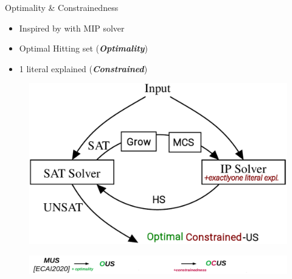 \documentclass{beamer}
\begin{document}
\begin{frame}{Optimality \& Constrainedness}
	\begin{minipage}{0.49\textwidth}
		\begin{itemize}
			\item Inspired by \cite{ignatiev2015smallest} with MIP solver
			\item Optimal Hitting set (\emph{\textbf{Optimality}})
			\item 1 literal explained (\emph{\textbf{Constrained}})
		\end{itemize}
	\end{minipage}
	\begin{minipage}{0.5\textwidth}
		\begin{figure}
			\includegraphics[width=\textwidth]{ihs_constrained.png}
		\end{figure}
	\end{minipage}
\vfill
\begin{figure}[h]
	\includegraphics[width=\textwidth]{mus_to_ocus.png}
\end{figure}

\end{frame}
\end{document}
